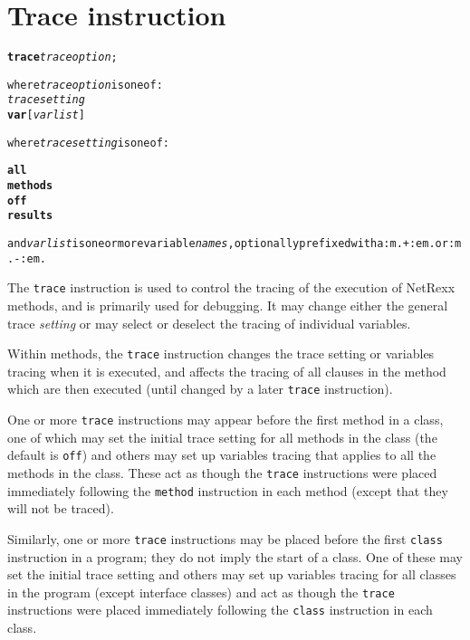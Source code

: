 \chapter{Trace instruction}\label{"id"}
\index{,}
\index{,}
\begin{shaded}
\begin{alltt}
\textbf{trace} \emph{traceoption};

where \emph{traceoption} is one of:
    \emph{tracesetting}
    \textbf{var} [\emph{varlist}]

where \emph{tracesetting} is one of:

    \textbf{all}
    \textbf{methods}
    \textbf{off}
    \textbf{results}

and \emph{varlist} is one or more variable \emph{names}, optionally prefixed with a :m.+:em. or :m.-:em.
\end{alltt}
\end{shaded}
 The \texttt{trace} instruction is used to control the tracing of the
execution of NetRexx methods, and is primarily used for debugging.
It may change either the general trace \emph{setting} or may select
or deselect the tracing of individual variables.
 
Within methods, the \texttt{trace} instruction changes the trace setting
or variables tracing when it is executed, and affects the tracing of
all clauses in the method which are then executed (until changed by a
later \texttt{trace} instruction).
 
One or more \texttt{trace} instructions may appear before the first
method in a class, one of which may set the initial trace setting
for all methods in the class (the default is \texttt{off}) and others
may set up variables tracing that applies to all the methods in the
class.
These act as though the \texttt{trace} instructions were
placed immediately following the \texttt{method} instruction in each
method (except that they will not be traced).
 
Similarly, one or more \texttt{trace} instructions may be placed
before the first \texttt{class} instruction in a program; they do not
imply the start of a class.  One of these may set the initial trace
setting and others may set up variables tracing for all classes in
the program (except interface classes) and act as though the
\texttt{trace} instructions were placed immediately following the
\texttt{class} instruction in each class.
